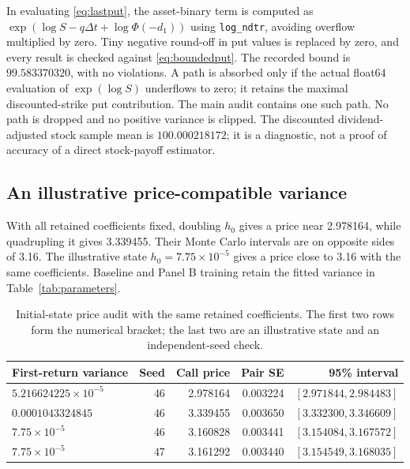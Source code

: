 \documentclass[11pt,a4paper]{article}
\newcommand{\dt}{\Delta t}
\theoremstyle{remark}
\begin{document}
In evaluating \eqref{eq:lastput}, the asset-binary term is computed as $\exp(\log S-q\dt+\log\Phi(-d_1))$ using \texttt{log\_ndtr}, avoiding overflow multiplied by zero. Tiny negative round-off in put values is replaced by zero, and every result is checked against \eqref{eq:boundedput}. The recorded bound is $99.583370320$, with no violations. A path is absorbed only if the actual float64 evaluation of $\exp(\log S)$ underflows to zero; it retains the maximal discounted-strike put contribution. The main audit contains one such path. No path is dropped and no positive variance is clipped. The discounted dividend-adjusted stock sample mean is $100.000218172$; it is a diagnostic, not a proof of accuracy of a direct stock-payoff estimator.

\subsection{An illustrative price-compatible variance}
With all retained coefficients fixed, doubling $h_0$ gives a price near 2.978164, while quadrupling it gives 3.339455. Their Monte Carlo intervals are on opposite sides of 3.16. The illustrative state $h_0=7.75\times10^{-5}$ gives a price close to 3.16 with the same coefficients. Baseline and Panel B training retain the fitted variance in Table~\ref{tab:parameters}.
\begin{table}[htbp]
\centering\small
\caption{Initial-state price audit with the same retained coefficients. The first two rows form the numerical bracket; the last two are an illustrative state and an independent-seed check.}
\label{tab:priceaudit}
\begin{tabular}{@{}lrrrr@{}}
\toprule
First-return variance & Seed & Call price & Pair SE & 95\% interval\\
\midrule
$5.216624225\times 10^{-5}$ & 46 & 2.978164 & 0.003224 & $[2.971844,2.984483]$ \\
$0.0001043324845$ & 46 & 3.339455 & 0.003650 & $[3.332300,3.346609]$ \\
$7.75\times 10^{-5}$ & 46 & 3.160828 & 0.003441 & $[3.154084,3.167572]$ \\
$7.75\times 10^{-5}$ & 47 & 3.161292 & 0.003440 & $[3.154549,3.168035]$ \\
\bottomrule
\end{tabular}
\end{table}
\end{document}
